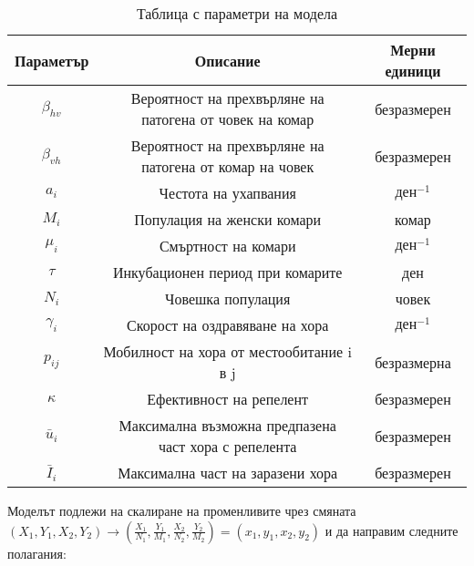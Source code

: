 \begin{table}[h]
  \centering
  \caption{Таблица с параметри на модела}
  \begin{tabular}{ |c c c|  }
    \hline
    Параметър & Описание & Мерни единици\\
    \hline
    $\beta_{hv}$ & Вероятност на прехвърляне на патогена от човек на комар & безразмерен\\
    $\beta_{vh}$ & Вероятност на прехвърляне на патогена от комар на човек & безразмерен\\
    $a_i$ & Честота на ухапвания & $\text{ден}^{-1}$\\
    $M_i$ & Популация на женски комари & комар\\
    $\mu_i$ & Смъртност на комари & $\text{ден}^{-1}$\\
    $\tau$ & Инкубационен период при комарите & ден\\
    $N_i$ & Човешка популация & човек\\
    $\gamma_i$ & Скорост на оздравяване на хора & $\text{ден}^{-1}$\\
    $p_{ij}$ & Мобилност на хора от местообитание i в j & безразмерна\\
    $\kappa$ & Ефективност на репелент & безразмерен\\
    $\bar{u}_i$ & Максимална възможна предпазена част хора с репелента & безразмерен\\
    $\bar{I}_i$ & Максимална част на заразени хора & безразмерен\\
    \hline
  \end{tabular}
  \label{table:1}
\end{table}

Моделът подлежи на скалиране на променливите чрез смяната $(X_1, Y_1, X_2, Y_2) \rightarrow (\frac{X_1}{N_1}, \frac{Y_1}{M_1}, \frac{X_2}{N_2}, \frac{Y_2}{M_2}) = (x_1, y_1, x_2, y_2)$ и да направим следните полагания:

